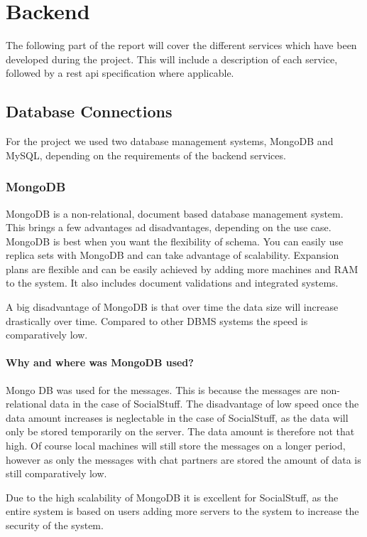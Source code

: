 \section{Backend}\label{sec:backend}

The following part of the report will cover the different services which have been developed during the project.
This will include a description of each service, followed by a \ac{rest} \ac{api} specification where applicable.

\subsection{Database Connections}\label{subsec:database-connections}

For the project we used two database management systems, MongoDB and MySQL, depending on the requirements of the backend
services.

\subsubsection{MongoDB}
MongoDB is a non-relational, document based database management system.
This brings a few advantages ad disadvantages, depending on the use case.
MongoDB is best when you want the flexibility of schema.
You can easily use replica sets with MongoDB and can take advantage of scalability.
Expansion plans are flexible and can be easily achieved by adding more machines and RAM to the system.
It also includes document validations and integrated systems.

A big disadvantage of MongoDB is that over time the data size will increase drastically over time.
Compared to other DBMS systems the speed is comparatively low.

\paragraph{Why and where was MongoDB used?}
Mongo DB was used for the messages.
This is because the messages are non-relational data in the case of SocialStuff.
The disadvantage of low speed once the data amount increases is neglectable in the case of SocialStuff, as the data will
only be stored temporarily on the server.
The data amount is therefore not that high.
Of course local machines will still store the messages on a longer period, however as only the messages with chat
partners are stored the amount of data is still comparatively low.

Due to the high scalability of MongoDB it is excellent for SocialStuff, as the entire system is based on users adding
more servers to the system to increase the security of the system.


